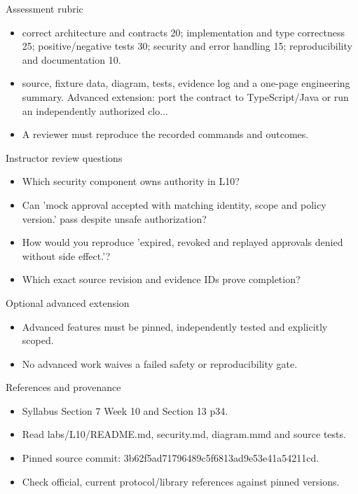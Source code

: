 \documentclass[aspectratio=169,10pt]{beamer}
\begin{document}
\begin{frame}{Assessment rubric}
\small
\begin{itemize}
\item correct architecture and contracts 20; implementation and type correctness 25; positive/negative tests 30; security and error handling 15; reproducibility and documentation 10.
\item source, fixture data, diagram, tests, evidence log and a one-page engineering summary. Advanced extension: port the contract to TypeScript/Java or run an independently authorized clo...
\item A reviewer must reproduce the recorded commands and outcomes.
\end{itemize}

\end{frame}

\begin{frame}{Instructor review questions}
\small
\begin{itemize}
\item Which security component owns authority in L10?
\item Can 'mock approval accepted with matching identity, scope and policy version.' pass despite unsafe authorization?
\item How would you reproduce 'expired, revoked and replayed approvals denied without side effect.'?
\item Which exact source revision and evidence IDs prove completion?
\end{itemize}

\end{frame}

\begin{frame}{Optional advanced extension}
\small
\begin{itemize}
\item Advanced features must be pinned, independently tested and explicitly scoped.
\item No advanced work waives a failed safety or reproducibility gate.
\end{itemize}

\end{frame}

\begin{frame}{References and provenance}
\small
\begin{itemize}
\item Syllabus Section 7 Week 10 and Section 13 p34.
\item Read labs/L10/README.md, security.md, diagram.mmd and source tests.
\item Pinned source commit: 3b62f5ad71796489c5f6813ad9e53e41a54211cd.
\item Check official, current protocol/library references against pinned versions.
\end{itemize}

\end{frame}
\end{document}
